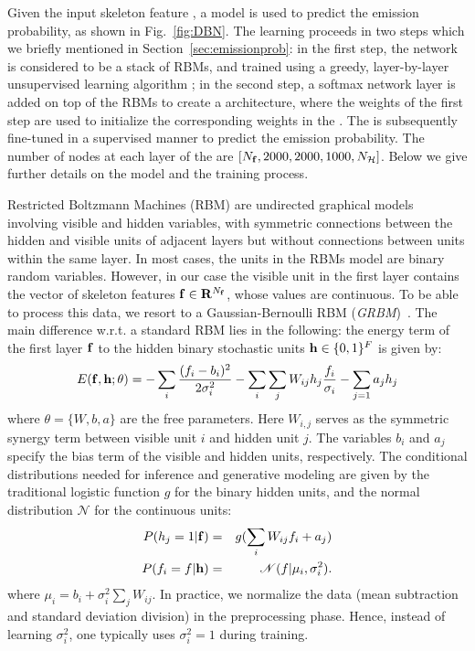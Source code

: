 Given the input skeleton feature \skfeature, a \DBN model is used to predict the emission probability, as shown in Fig.~\ref{fig:DBN}.
 The learning proceeds in two steps which we briefly mentioned in Section~\ref{sec:emissionprob}:
in the first step, the network is considered to be a stack of RBMs, and trained using a greedy, layer-by-layer
unsupervised learning algorithm \cite{hinton2006fast};
in the second step, a softmax network layer is added on top of the RBMs to create a \DBN architecture,
where the  weights of the first step are used to initialize the corresponding weights in the \DBN.
The \DBN is subsequently fine-tuned in a supervised manner to predict the emission probability.
%
The number of nodes at each layer of the \DBN are $[N_{\mathbf{f}},2000,2000,1000,N_{\mathcal{H}}]$.
Below we give further details on the model and the training process.

%
Restricted Boltzmann Machines (RBM) are undirected graphical models involving visible and hidden variables,
with symmetric connections between the hidden and visible units of adjacent layers but without connections between units within the same layer.
%
In most cases, the units in the RBMs model are binary random variables.
%
However, in our case the visible unit in the first layer contains the vector of skeleton features $\mathbf{f} \in \mathbf{R}^{N_{\mathbf{f}}}$, whose values are continuous.
To be able to process this data, we resort to a Gaussian-Bernoulli RBM (\emph{GRBM})~\cite{salakhutdinov2009learning}.
The main difference w.r.t. a standard RBM lies in the following:
the energy term of the first layer $\mathbf{f}$ to the hidden binary stochastic units $\mathbf{h} \in \{0,1\}^F$ is given by:
\begin{equation}
    E(\skfeature,\rbmh;\theta) =-\sum_{i} \frac{(\skfeatureel_i-b_i)^2}{2\sigma_i^2} -\sum_{i} \sum_{j} W_{ij}  \rbmhel_j \frac{\skfeatureel_i}{\sigma_i}- \sum_{j=1}a_j\rbmhel_j
\label{GRBMenergy}
\end{equation}
where $\theta=\{W,b,a\}$ are the free parameters. Here $W_{i,j}$ serves as the symmetric synergy term between visible unit $i$ and hidden unit $j$.
The variables $b_i$ and $a_j$ specify the bias term of the visible and hidden units, respectively.
%
The conditional distributions needed for inference and generative modeling are given by the traditional logistic function $g$ for the binary hidden units, and the normal distribution $\mathscr{N}$  for the continuous units:
\begin{eqnarray}
    P(h_j=1 | \mathbf{f}) & = & g (\sum_i W_{ij} f_i+a_j) \\
    P(f_i=f|\mathbf{h}) & = & \mathscr{N}( f |\mu_i,\sigma_i^2).
\end{eqnarray}
where $\mu_i=b_i+\sigma_i^2 \sum_j W_{ij}$.
In practice, we normalize the data (mean subtraction and standard deviation division) in the preprocessing phase.
Hence, instead of learning $\sigma_i^2$, one typically uses  $\sigma_i^2=1$ during training.

